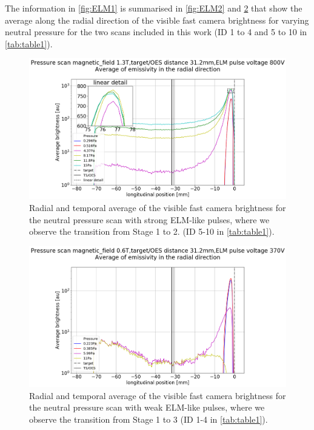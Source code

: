 The information in \autoref{fig:ELM1} is summarised in \autoref{fig:ELM2} and \ref{fig:ELM3} that show the average along the radial direction of the visible fast camera brightness for varying neutral pressure for the two scans included in this work (ID 1 to 4 and 5 to 10 in \autoref{tab:table1}).

\begin{figure}[!ht]
	\centering
	\includegraphics[width=0.7\linewidth,trim={110 0 170 85},clip]{Chapters/chapter3/figs/20.png}
	\caption{Radial and temporal average of the visible fast camera brightness for the neutral pressure scan with strong ELM-like pulses, where we observe the transition from Stage 1 to 2. (ID 5-10 in \autoref{tab:table1}).}
	\label{fig:ELM2}
\end{figure}

\begin{figure}[!ht]
	\centering
	\includegraphics[width=0.7\linewidth,trim={110 0 170 85},clip]{Chapters/chapter3/figs/39.png}
	\caption{Radial and temporal average of the visible fast camera brightness for the neutral pressure scan with weak ELM-like pulses, where we observe the transition from Stage 1 to 3 (ID 1-4 in \autoref{tab:table1}).}
	\label{fig:ELM3}
\end{figure}

